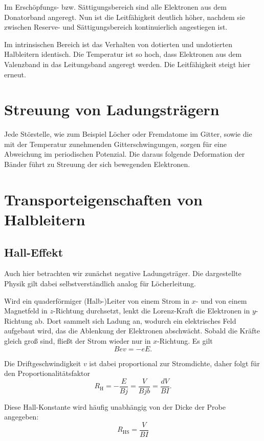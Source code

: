 Im Erschöpfungs- bzw. Sättigungsbereich sind alle Elektronen aus dem
Donatorband angeregt. Nun ist die Leitfähigkeit deutlich höher, nachdem sie
zwischen Reserve- und Sättigungsbereich kontinuierlich angestiegen ist.

Im intrinsischen Bereich ist das Verhalten von dotierten und undotierten
Halbleitern identisch. Die Temperatur ist so hoch, dass Elektronen aus dem
Valenzband in das Leitungsband angeregt werden. Die Leitfähigkeit steigt hier
erneut.

\section{Streuung von Ladungsträgern}

Jede Störstelle, wie zum Beispiel Löcher oder Fremdatome im Gitter, sowie die
mit der Temperatur zunehmenden Gitterschwingungen, sorgen für
eine Abweichung im periodischen Potenzial. Die daraus folgende Deformation der
Bänder führt zu Streuung der sich bewegenden Elektronen.

\section{Transporteigenschaften von Halbleitern}

\subsection{Hall-Effekt}

Auch hier betrachten wir zunächst negative Ladungsträger. Die dargestellte
Physik gilt dabei selbstverständlich analog für Löcherleitung.

Wird ein quaderförmiger (Halb-)Leiter von einem Strom in $x$- und von einem
Magnetfeld in $z$-Richtung durchsetzt, lenkt die Lorenz-Kraft die Elektronen
in $y$-Richtung ab. Dort sammelt sich Ladung an, wodurch ein elektrisches Feld
aufgebaut wird, das die Ablenkung der Elektronen abschwächt. Sobald die Kräfte
gleich groß sind, fließt der Strom wieder nur in $x$-Richtung. Es gilt
\[
    Bev = -eE.
\]

Die Driftgeschwindigkeit $v$ ist dabei proportional zur Stromdichte,
daher folgt für den Proportionalitätsfaktor
\[
    R_\text{H} = -\frac{E}{Bj} = \frac{V}{Bjb} = \frac{dV}{BI}.
\]

Diese Hall-Konstante wird häufig unabhängig von der Dicke der Probe
angegeben:
\[
    R_\text{HS} = \frac{V}{BI}
\]

